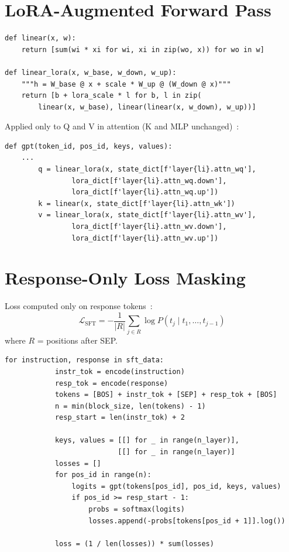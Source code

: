 \documentclass[11pt,a4paper]{article}
\begin{document}
\section{LoRA-Augmented Forward Pass}

\begin{lstlisting}[firstnumber=128]
def linear(x, w):
    return [sum(wi * xi for wi, xi in zip(wo, x)) for wo in w]

def linear_lora(x, w_base, w_down, w_up):
    """h = W_base @ x + scale * W_up @ (W_down @ x)"""
    return [b + lora_scale * l for b, l in zip(
        linear(x, w_base), linear(linear(x, w_down), w_up))]
\end{lstlisting}

Applied only to Q and V in attention (K and MLP unchanged)~\cite{hu2021lora}:

\begin{lstlisting}[firstnumber=144]
def gpt(token_id, pos_id, keys, values):
    ...
        q = linear_lora(x, state_dict[f'layer{li}.attn_wq'],
                lora_dict[f'layer{li}.attn_wq.down'],
                lora_dict[f'layer{li}.attn_wq.up'])
        k = linear(x, state_dict[f'layer{li}.attn_wk'])
        v = linear_lora(x, state_dict[f'layer{li}.attn_wv'],
                lora_dict[f'layer{li}.attn_wv.down'],
                lora_dict[f'layer{li}.attn_wv.up'])
\end{lstlisting}

\section{Response-Only Loss Masking}

Loss computed only on response tokens~\cite{wei2022finetuned}:
\[
\mathcal{L}_{\text{SFT}} = -\frac{1}{|R|} \sum_{j \in R} \log P(t_j \mid t_1, \ldots, t_{j-1})
\]
where $R$ = positions after SEP.

\begin{lstlisting}[firstnumber=224]
        for instruction, response in sft_data:
            instr_tok = encode(instruction)
            resp_tok = encode(response)
            tokens = [BOS] + instr_tok + [SEP] + resp_tok + [BOS]
            n = min(block_size, len(tokens) - 1)
            resp_start = len(instr_tok) + 2

            keys, values = [[] for _ in range(n_layer)],
                           [[] for _ in range(n_layer)]
            losses = []
            for pos_id in range(n):
                logits = gpt(tokens[pos_id], pos_id, keys, values)
                if pos_id >= resp_start - 1:
                    probs = softmax(logits)
                    losses.append(-probs[tokens[pos_id + 1]].log())

            loss = (1 / len(losses)) * sum(losses)
\end{lstlisting}
\end{document}
